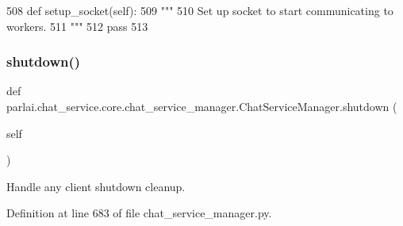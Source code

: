 \begin{DoxyCode}
508     \textcolor{keyword}{def }setup\_socket(self):
509         \textcolor{stringliteral}{"""}
510 \textcolor{stringliteral}{        Set up socket to start communicating to workers.}
511 \textcolor{stringliteral}{        """}
512         \textcolor{keywordflow}{pass}
513 
\end{DoxyCode}
\mbox{\label{classparlai_1_1chat__service_1_1core_1_1chat__service__manager_1_1ChatServiceManager_af2ba119314976bd2ae1524967fe9b1f1}} 
\subsubsection{\texorpdfstring{shutdown()}{shutdown()}}
{\footnotesize\ttfamily def parlai.\+chat\+\_\+service.\+core.\+chat\+\_\+service\+\_\+manager.\+Chat\+Service\+Manager.\+shutdown (\begin{DoxyParamCaption}\item[{}]{self }\end{DoxyParamCaption})}

\begin{DoxyVerb}Handle any client shutdown cleanup.
\end{DoxyVerb}
 

Definition at line 683 of file chat\+\_\+service\+\_\+manager.\+py.



